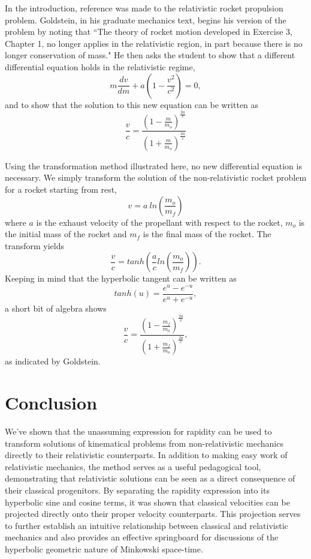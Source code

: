 \documentclass[prb,preprint]{revtex4-1}
\begin{document}
In the introduction, reference was made to the relativistic rocket propulsion problem.  Goldstein, in his graduate mechanics text\cite{goldsteini}, begins his version of the problem by noting that ``The theory of rocket motion developed in Exercise 3, Chapter 1, no longer applies in the relativistic region, in part because there is no longer conservation of mass."  He then asks the student to show that a different differential equation holds in the relativistic regime,
\begin{equation}
m\frac{dv}{dm}+a\left(1-\frac{v^2}{c^2}\right)=0,
\end{equation}
and to show that the solution to this new equation can be written as 
\begin{equation}
\frac{v}{c}=\frac{\left(1-\frac{m}{m_o}\right)^{\frac{2a}{c}}}{\left(1+\frac{m}{m_o}\right)^{\frac{2a}{c}}}
\end{equation}

Using the transformation method illustrated here, no new differential equation is necessary.  We simply transform the solution of the non-relativistic rocket problem for a rocket starting from rest, 
\begin{equation}
v=a\ ln\left(\frac{m_o}{m_f}\right)
\end{equation}
where $a$ is the exhaust velocity of the propellant with respect to the rocket,   $m_o$ is the initial mass of the rocket and $m_f$ is the final mass of the rocket.  The transform yields 
\begin{equation}
\frac{v}{c}=tanh\left(\frac{a}{c} ln\left(\frac{m_o}{m_f}\right)\right).
\end{equation}
Keeping in mind that the hyperbolic tangent can be written as
\begin{equation}
tanh\left(u\right)=\frac{e^u-e^{-u}}{e^u+e^{-u}},
\end{equation}
a short bit of algebra shows
\begin{equation}
\frac{v}{c}=\frac{\left(1-\frac{m_f}{m_o}\right)^{\frac{2a}{c}}}{\left(1+\frac{m_f}{m_o}\right)^{\frac{2a}{c}}},
\end{equation}
as indicated by Goldstein.

\section{Conclusion}

We've shown that the unassuming expression for rapidity can be used to transform solutions of kinematical problems from non-relativistic mechanics directly to their relativistic counterparts.  In addition to making easy work of relativistic mechanics, the method serves as a useful pedagogical tool, demonstrating that relativistic solutions can be seen as a direct consequence of their classical progenitors.  By separating the rapidity expression into its hyperbolic sine and cosine terms, it was shown that classical velocities can be projected directly onto their proper velocity counterparts.  This projection serves to further establish an intuitive relationship between classical and relativistic mechanics and also provides an effective springboard for discussions of the hyperbolic geometric nature of Minkowski space-time.
\end{document}
